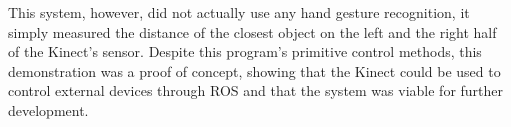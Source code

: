 This system, however, did not actually use any hand gesture recognition, it simply measured the distance of the closest object on the left and the right half of the Kinect's sensor.
Despite this program's primitive control methods, this demonstration was a proof of concept, showing that the Kinect could be used to control external devices through ROS and that the system was viable for further development.